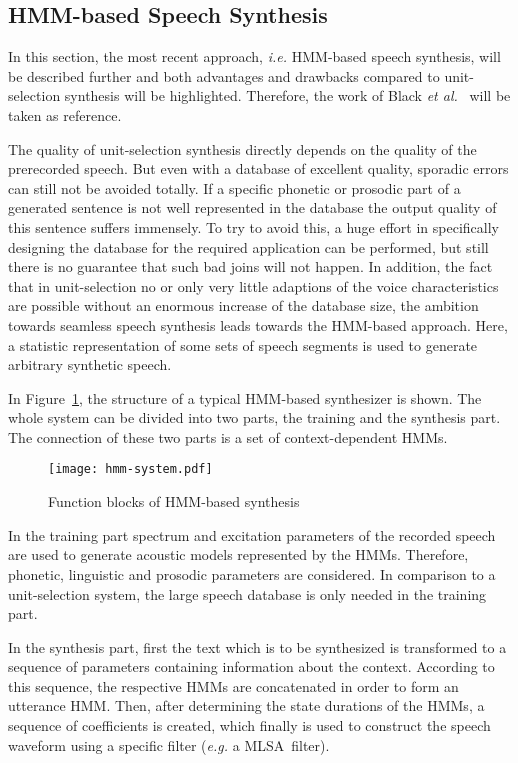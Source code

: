 \subsection{\ac{HMM}-based Speech Synthesis}
\label{subsec:hmmspeech}

In this section, the most recent approach, \textit{i.e.} \ac{HMM}-based speech synthesis, will be described further and both advantages and drawbacks compared to unit-selection synthesis will be highlighted. Therefore, the work of Black \textit{et al.}~\cite{black:statistical} will be taken as reference.

The quality of unit-selection synthesis directly depends on the quality of the prerecorded speech. But even with a database of excellent quality, sporadic errors can still not be avoided totally. If a specific phonetic or prosodic part of a generated sentence is not well represented in the database the output quality of this sentence suffers immensely. To try to avoid this, a huge effort in specifically designing the database for the required application can be performed, but still there is no guarantee that such bad joins will not happen. In addition, the fact that in unit-selection no or only very little adaptions of the voice characteristics are possible without an enormous increase of the database size, the ambition towards seamless speech synthesis leads towards the \ac{HMM}-based approach. Here, a statistic representation of some sets of speech segments is used to generate arbitrary synthetic speech.

In Figure~\ref{fig:hmm}, the structure of a typical \ac{HMM}-based synthesizer is shown. The whole system can be divided into two parts, the training and the synthesis part. The connection of these two parts is a set of context-dependent \acp{HMM}. 

\begin{figure}[h]
	\texttt{[image: hmm-system.pdf]}
	\caption{Function blocks of \ac{HMM}-based synthesis~\cite{black:statistical}}
	\label{fig:hmm}
\end{figure}

In the training part spectrum and excitation parameters %
of the recorded speech are used to generate acoustic models represented by the \acp{HMM}. Therefore, phonetic, linguistic and prosodic parameters are considered. In comparison to a unit-selection system, the large speech database is only needed in the training part.

In the synthesis part, first the text which is to be synthesized is transformed to a sequence of parameters containing information about the context. %
According to this sequence, the respective \acp{HMM} are concatenated in order to form an utterance \ac{HMM}. Then, after determining the state durations of the \acp{HMM}, a sequence of coefficients is created, which finally is used to construct the speech waveform using a specific filter (\textit{e.g.} a \ac{MLSA}~filter). %

